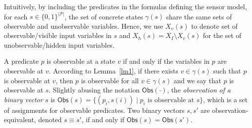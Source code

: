 \documentclass[letterpaper, 10 pt, conference]{ieeeconf}
\providecommand{\abs}[1]{\lvert#1\rvert}
\begin{document}
Intuitively, by including the predicates in the formulas
defining the sensor model, for each $s \in \{0,1\}^{\abs{\mathcal{P}}}$, the set of 
concrete states $\gamma(s)$ share the same sets of observable and
unobservable variables. Hence, we use $X_v(s)$ to denote set of
observable/visible input variables in $s$ and $X_h(s) = X_I \setminus X_v(s)$ for the set of
unobservable/hidden input variables.

A predicate $p$ is observable at a state $v$ if and only if the variables
in $p$ are observable at $v$. According to Lemma~\ref{lm1}, if
there exists $ v\in \gamma(s)$ such that $p$ is observable at $v$, then $p$ is
observable for all $v\in \gamma(s)$ and we say that $p$ is observable at
$s$. Slightly abusing the notation $\mathsf{Obs}(\cdot)$, the
\emph{observation of a binary vector} $s$ is
$\mathsf{Obs}(s) = \{ (p_i,s(i))\mid p_i \text{ is observable at } s  \}$,
which is a set of assignments for observable predicates. Two binary
vectors $s,s'$ are observation-equivalent, denoted $s\equiv s'$, if and
only if
$\mathsf{Obs}(s)= \mathsf{Obs}(s')$.
\end{document}
